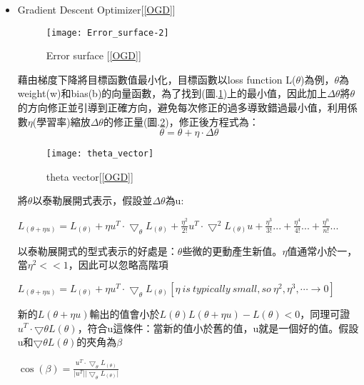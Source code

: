\begin{itemize}
\item Gradient Descent Optimizer[\ref{OGD}]\\

\begin{figure}[hbt!]
\begin{center}
\texttt{[image: Error\_surface-2]}
\caption{\Large Error surface [\ref{OGD}]}
\label{Error_surface-2}
\end{center}
\end{figure}
 藉由梯度下降將目標函數值最小化，目標函數以loss function L($\theta$)為例，$\theta$為weight(w)和bias(b)的向量函數，為了找到(圖.\ref{Error_surface-2})上的最小值，因此加上$\Delta\theta$將$\theta$ 的方向修正並引導到正確方向，避免每次修正的過多導致錯過最小值，利用係數$\eta$(學習率)縮放$\Delta\theta$的修正量(圖.\ref{theta_vector})，修正後方程式為：
$$\theta=\theta+\eta\cdot\Delta\theta$$
\begin{figure}
\begin{center}
\texttt{[image: theta\_vector]}
\caption{\Large theta vector[\ref{OGD}]}
\label{theta_vector}
\end{center}
\end{figure}
\newpage
將$\theta$以泰勒展開式表示，假設並$\Delta\theta$為u:
\begin{center}
$L_{(\theta+\eta u)}=L_{(\theta)}+\eta u^{T}\cdot\bigtriangledown_{\theta} L_{(\theta)}+\frac{\eta^2}{2!}u^T\cdot\bigtriangledown^2 L_{(\theta)}u+\frac{\eta^3}{3!}...+\frac{\eta^4}{4!}...+\frac{\eta^n}{n!}...$\\
\end{center}
以泰勒展開式的型式表示的好處是：$\theta$些微的更動產生新值。$\eta$值通常小於一，當$\eta^2 << 1$，因此可以忽略高階項 
\begin{center}
$L_{(\theta+\eta u)}=L_{(\theta)}+\eta u^{T}\cdot\bigtriangledown_{\theta} L_{(\theta)} [\eta\ is\ typically\ small, so\ \eta^2, \eta^3,\cdots \rightarrow 0]$\\
\end{center}
新的$L(\theta + \eta u)$輸出的值會小於$L(\theta) L(\theta+\eta u) − L(\theta) < 0$，同理可證$u^T\cdot\bigtriangledown\theta L(\theta)$，符合u這條件：當新的值小於舊的值，u就是一個好的值。假設u和$\bigtriangledown\theta L(\theta)$的夾角為$\beta$\\
\begin{center}
$\cos(\beta)=\frac{u^{T}\cdot\bigtriangledown_{\theta} L_{(\theta)}}{\vert u^{T}\vert\vert \bigtriangledown_{\theta} L_{(\theta)}\vert}$\\

\end{center}
\end{itemize}
